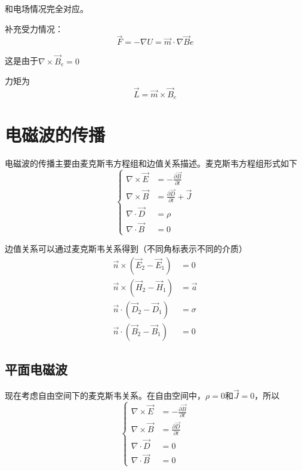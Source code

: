 \documentclass[UTF8]{ctexart}
\begin{document}
\noindent 和电场情况完全对应。

    补充受力情况：
    \begin{equation}
        \vec{F} = - \nabla U = \vec{m} \cdot \nabla \vec{B}e
    \end{equation}

\noindent 这是由于$\nabla \times \vec{B}_e =0$

    力矩为
    \begin{equation}
        \vec{L} = \vec{m} \times \vec{B}_e
    \end{equation}

    \section{电磁波的传播}
    电磁波的传播主要由麦克斯韦方程组和边值关系描述。麦克斯韦方程组形式如下
    \begin{equation}
        \left\{ \begin{aligned}
            \nabla \times \vec{E} &= - \frac{\partial \vec{B}}{\partial t}\\
            \nabla \times \vec{B} &= \frac{\partial \vec{D}}{\partial t} + \vec{J}\\
            \nabla \cdot \vec{D} &=\rho \\
            \nabla \cdot \vec{B} &=0
        \end{aligned}
        \right.
    \end{equation}

    边值关系可以通过麦克斯韦关系得到（不同角标表示不同的介质）
    \begin{equation}
        \begin{aligned}
            \vec{n} \times (\vec{E}_2 - \vec{E}_1) &=0 \\
            \vec{n} \times (\vec{H}_2 - \vec{H}_1) &=\vec{a} \\
            \vec{n} \cdot (\vec{D}_2 - \vec{D}_1) &=\sigma \\
            \vec{n} \cdot (\vec{B}_2 - \vec{B}_1) &=0 
        \end{aligned}\label{equ4.2}
    \end{equation}

    \subsection{平面电磁波}
    现在考虑自由空间下的麦克斯韦关系。在自由空间中，$\rho=0$和$\vec{J} = 0$，所以
    \begin{equation}
    \left\{ \begin{aligned}
        \nabla \times \vec{E} &= - \frac{\partial \vec{B}}{\partial t}\\
        \nabla \times \vec{B} &= \frac{\partial \vec{D}}{\partial t}\\
        \nabla \cdot \vec{D} &=0 \\
        \nabla \cdot \vec{B} &=0
    \end{aligned}
    \right.
    \end{equation}
\end{document}
